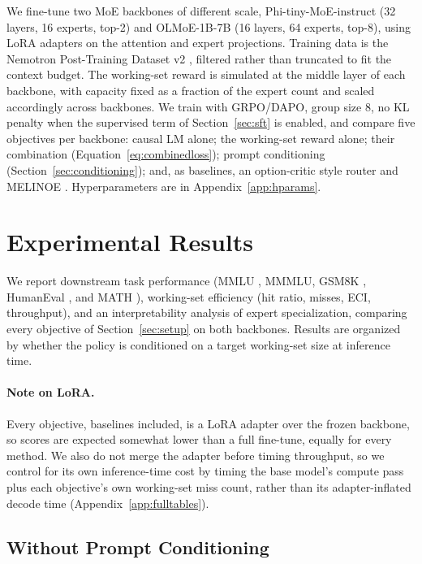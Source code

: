 \documentclass{article}
\begin{document}
We fine-tune two MoE backbones of different scale, Phi-tiny-MoE-instruct (32 layers, 16
experts, top-2) and OLMoE-1B-7B \citep{muennighoff2024olmoe} (16 layers, 64 experts,
top-8), using LoRA \citep{hu2021lora} adapters on the attention and expert projections.
Training data is the Nemotron Post-Training Dataset v2 \citep{nvidia2025nemotron},
filtered rather than truncated to fit the context budget. The working-set reward is
simulated at the middle layer of each backbone, with capacity fixed as a fraction of the
expert count and scaled accordingly across backbones. We train with GRPO/DAPO, group size
$8$, no KL penalty when the supervised term of Section~\ref{sec:sft} is enabled, and
compare five objectives per backbone: causal LM alone; the working-set reward alone; their
combination (Equation~\ref{eq:combinedloss}); prompt conditioning
(Section~\ref{sec:conditioning}); and, as baselines, an option-critic style router
\citep{shen2026temporal,bacon2017optioncritic} and MELINOE \citep{raje2026melinoe}.
Hyperparameters are in Appendix~\ref{app:hparams}.

\section{Experimental Results}
\label{sec:results}

We report downstream task performance (MMLU \citep{hendrycks2021mmlu}, MMMLU, GSM8K
\citep{cobbe2021gsm8k}, HumanEval \citep{chen2021humaneval}, and MATH
\citep{hendrycks2021math}), working-set efficiency (hit ratio, misses, ECI, throughput), and an
interpretability analysis of expert specialization, comparing every objective of
Section~\ref{sec:setup} on both backbones. Results are organized by whether the policy
is conditioned on a target working-set size at inference time.

\paragraph{Note on LoRA.} Every objective, baselines included, is a LoRA adapter over the
frozen backbone, so scores are expected somewhat lower than a full fine-tune, equally for
every method. We also do not merge the adapter before timing throughput, so we control for
its own inference-time cost by timing the base model's compute pass plus each objective's
own working-set miss count, rather than its adapter-inflated decode time
(Appendix~\ref{app:fulltables}).

\subsection{Without Prompt Conditioning}
\label{sec:results-unconditioned}
\end{document}
